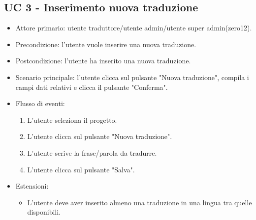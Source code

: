 \subsection{UC 3 - Inserimento nuova traduzione}
    \begin{itemize}
        \item Attore primario: utente traduttore/utente admin/utente super admin(zero12).
        \item Precondizione: l'utente vuole inserire una nuova traduzione.
        \item Postcondizione: l'utente ha inserito una nuova traduzione.
        \item Scenario principale: l'utente clicca sul pulsante "Nuova traduzione", compila i campi dati relativi e clicca il pulsante "Conferma".
        \item Flusso di eventi:
            \begin{enumerate}
                \item L'utente seleziona il progetto.
                \item L'utente clicca sul pulsante "Nuova traduzione".
                \item L'utente scrive la frase/parola da tradurre.
                \item L'utente clicca sul pulsante "Salva".
            \end{enumerate}
        \item Estensioni:
            \begin{itemize}
                \item L'utente deve aver inserito almeno una traduzione in una lingua tra quelle disponibili.
            \end{itemize}
    \end{itemize}
